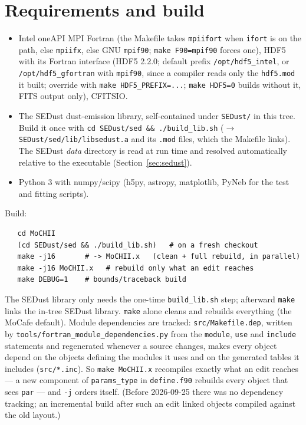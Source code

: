 \documentclass[english,a4paper]{my_memo}
\newcommand{\code}[1]{\texttt{#1}}
\begin{document}
\section{Requirements and build}
\begin{itemize}
\item Intel oneAPI MPI Fortran (the Makefile takes \code{mpiifort} when
  \code{ifort} is on the path, else \code{mpiifx}, else GNU \code{mpif90};
  \code{make F90=mpif90} forces one), HDF5 with its Fortran interface
  (HDF5 2.2.0; default prefix \code{/opt/hdf5\_intel}, or
  \code{/opt/hdf5\_gfortran} with \code{mpif90}, since a compiler reads
  only the \code{hdf5.mod} it built; override with
  \code{make HDF5\_PREFIX=...}; \code{make HDF5=0} builds without it, FITS
  output only), CFITSIO.
\item The SEDust dust-emission library, self-contained under
  \code{SEDust/} in this tree.  Build it once with \code{cd SEDust/sed
  \&\& ./build\_lib.sh} ($\rightarrow$ \code{SEDust/sed/lib/libsedust.a}
  and its \code{.mod} files, which the Makefile links).  The SEDust
  \emph{data} directory is read at run time and resolved automatically
  relative to the executable (Section~\ref{sec:sedust}).
\item Python 3 with numpy/scipy (h5py, astropy, matplotlib, PyNeb for
  the test and fitting scripts).
\end{itemize}
Build:
\begin{verbatim}
   cd MoCHII
   (cd SEDust/sed && ./build_lib.sh)   # on a fresh checkout
   make -j16       # -> MoCHII.x   (clean + full rebuild, in parallel)
   make -j16 MoCHII.x   # rebuild only what an edit reaches
   make DEBUG=1    # bounds/traceback build
\end{verbatim}
The SEDust library only needs the one-time \code{build\_lib.sh} step;
afterward \code{make} links the in-tree SEDust library.
\code{make} alone cleans and rebuilds everything (the MoCafe default).
Module dependencies are tracked: \code{src/Makefile.dep}, written by
\code{tools/fortran\_module\_dependencies.py} from the \code{module},
\code{use} and \code{include} statements and regenerated whenever a source
changes, makes every object depend on the objects defining the modules it
uses and on the generated tables it includes (\code{src/*.inc}).  So
\code{make MoCHII.x} recompiles exactly what an edit reaches --- a new
component of \code{params\_type} in \code{define.f90} rebuilds every object
that sees \code{par} --- and \code{-j} orders itself.  (Before 2026-09-25 there
was no dependency tracking; an incremental build after such an edit linked
objects compiled against the old layout.)
\end{document}
